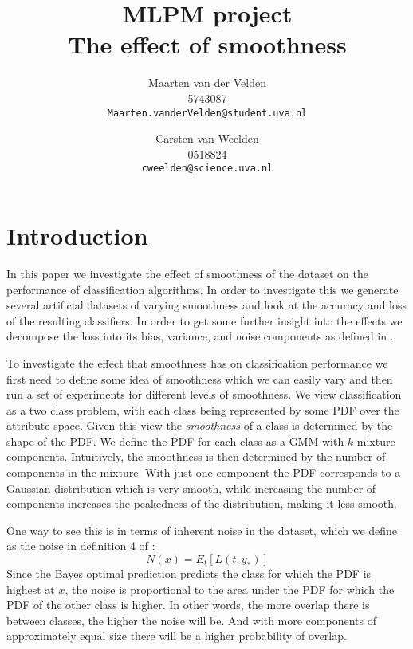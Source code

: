 \documentclass[a4paper]{article}
\begin{document}
\title{MLPM project \\ The effect of smoothness}
\author{Maarten van der Velden \\ 5743087 \\ \texttt{Maarten.vanderVelden@student.uva.nl} \and Carsten van Weelden \\ 0518824 \\ \texttt{cweelden@science.uva.nl}}
\maketitle


\acresetall

\section{Introduction}
\label{sec:introduction}

In this paper we investigate the effect of smoothness of the dataset on the performance of classification algorithms. In order to investigate this we generate several artificial datasets of varying smoothness and look at the accuracy and loss of the resulting classifiers. In order to get some further insight into the effects we decompose the loss into its bias, variance, and noise components as defined in \cite{Domingos2000}.


To investigate the effect that smoothness has on classification performance we first need to define some idea of smoothness which we can easily vary and then run a set of experiments for different levels of smoothness. We view classification as a two class problem, with each class being represented by some \ac{PDF} over the attribute space. Given this view the \emph{smoothness} of a class is determined by the shape of the \ac{PDF}. We define the \ac{PDF} for each class as a \ac{GMM} with $k$ mixture components. Intuitively, the smoothness is then determined by the number of components in the mixture. With just one component the \ac{PDF} corresponds to a Gaussian distribution which is very smooth, while increasing the number of components increases the peakedness of the distribution, making it less smooth.

One way to see this is in terms of inherent noise in the dataset, which we define as the noise in definition 4 of \cite{Domingos2000}:
\begin{equation}
\label{eq:noise}
N(x) = E_t[L(t,y_*)]
\end{equation}
Since the Bayes optimal prediction predicts the class for which the \ac{PDF} is highest at $x$, the noise is proportional to the area under the \ac{PDF} for which the \ac{PDF} of the other class is higher. In other words, the more overlap there is between classes, the higher the noise will be. And with more components of approximately equal size there will be a higher probability of overlap.
\end{document}
